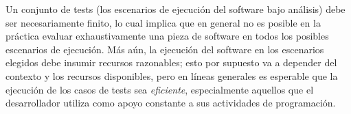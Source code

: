 

Un conjunto de tests (los escenarios de ejecuci\'on del software bajo an\'alisis) debe ser necesariamente finito, lo cual implica que en general no es posible en la pr\'actica evaluar exhaustivamente una pieza de software en todos los posibles escenarios de ejecuci\'on. M\'as a\'un, la ejecuci\'on del software en los escenarios elegidos debe insumir recursos razonables; esto por supuesto va a depender del contexto y los recursos disponibles, pero en l\'ineas generales es esperable que la ejecuci\'on de los casos de tests sea \emph{eficiente}, especialmente aquellos que el desarrollador utiliza como apoyo constante a sus actividades de programaci\'on. 



